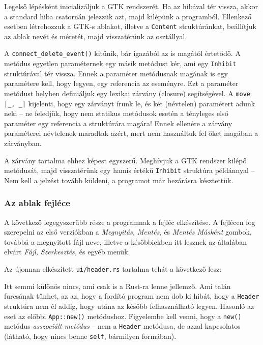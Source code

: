 Legelső lépésként inicializáljuk a GTK rendszerét.
Ha az hibával tér vissza, akkor a standard hiba csatornán jelezzük azt, majd kilépünk a programból.
Ellenkező esetben létrehozzuk a GTK-s ablakot, illetve a \texttt{Content} struktúránkat,
beállítjuk az ablak nevét és méretét, majd visszatérünk az osztállyal.

A \verb+connect_delete_event()+ kitűnik, bár igazából az is magától értetődő.
A metódus egyetlen paraméternek egy másik metódust kér, ami egy \texttt{Inhibit} struktúrával tér vissza.
Ennek a paraméter metódusnak magának is egy paramétere kell, hogy legyen, egy referencia az eseményre.
Ezt a paraméter metódust helyben definiáljuk egy lexikai zárvány (closure) segítségével.
A \verb+move |_, _|+ kijelenti, hogy egy zárványt írunk le, és két (névtelen) paramétert adunk neki --
ne feledjük, hogy nem statikus metódusok esetén a tényleges első paraméter egy referencia a struktúrára magára!
Ennek ellenére a zárvány paraméterei névtelenek maradtak azért, mert nem használtuk fel őket magában a zárványban.

A zárvány tartalma ehhez képest egyszerű.
Meghívjuk a GTK rendszer kilépő metódusát, majd visszatérünk egy hamis értékű \texttt{Inhibit} struktúra példánnyal --
Nem kell a jelzést tovább küldeni, a programot már bezárásra késztettük.

\subsubsection{Az ablak fejléce}

A következő legegyszerűbb része a programnak a fejléc elkészítése.
A fejlécen fog szerepelni az első verziókban a \textit{Megnyitás,} \textit{Mentés,} és \textit{Mentés Másként}
gombok, továbbá a megnyitott fájl neve,
illetve a későbbiekben itt lesznek az általában elvárt \textit{Fájl,} \textit{Szerkesztés,} és egyéb menük.

Az újonnan elkészített \texttt{ui/header.rs} tartalma tehát a következő lesz:



Itt semmi különös nincs, ami csak is a Rust-ra lenne jellemző.
Ami talán furcsának tűnhet, az az, hogy a fordító program nem dob ki hibát,
hogy a \texttt{Header} struktúra nem él addig, hogy utána az később felhasználható legyen.
Hasonló az eset az előbbi \texttt{App::new()} metódushoz.
Figyelembe kell venni, hogy a \texttt{new()} metódus \textit{asszociált metódus} --
nem a \texttt{Header} metódusa, de azzal kapcsolatos (látható, hogy nincs benne \texttt{self}, bármilyen formában).

